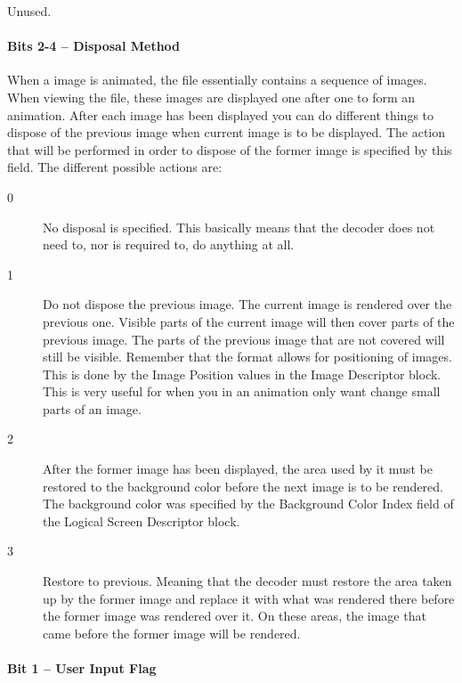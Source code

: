 Unused.

\paragraph{Bits 2-4 -- Disposal Method}

When a \gif image is animated, the file essentially contains a sequence
of images. When viewing the \gif file, these images are displayed one
after one to form an animation. After each image has been displayed
you can do different things to dispose of the previous image when
current image is to be displayed. The action that will be performed in
order to dispose of the former image is specified by this field. The
different possible actions are:

\begin{description}

\item[0] No disposal is specified. This basically means that the
  decoder does not need to, nor is required to, do anything at all.

\item[1] Do not dispose the previous image. The current image is
  rendered over the previous one. Visible parts of the current image
  will then cover parts of the previous image. The parts of the
  previous image that are not covered will still be visible. Remember
  that the \gif format allows for positioning of images. This is done
  by the Image Position values in the Image Descriptor block. This is
  very useful for when you in an animation only want change small
  parts of an image.

\item[2] After the former image has been displayed, the area used by
  it must be restored to the background color before the next image is
  to be rendered. The background color was specified by the Background
  Color Index field of the Logical Screen Descriptor block.

\item[3] Restore to previous. Meaning that the decoder must restore
  the area taken up by the former image and replace it with what was
  rendered there before the former image was rendered over it. On
  these areas, the image that came before the former image will be
  rendered.


\end{description}

\paragraph{Bit 1  -- User Input Flag}

